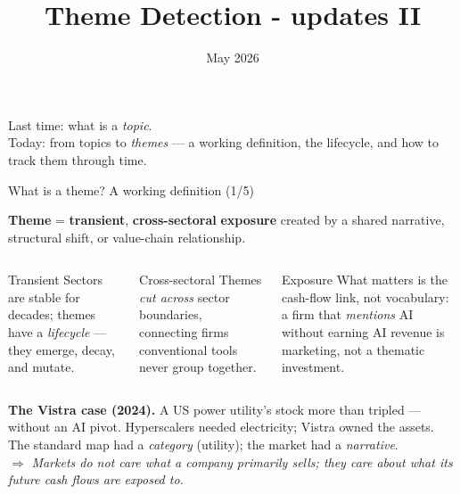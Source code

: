 \documentclass[10pt,aspectratio=169]{beamer}
\title{Theme Detection - updates II}
\date{May 2026}
\begin{document}
\begin{frame}[shrink=5]
  \titlepage
  \vspace{-1.0cm}
  \centering\footnotesize
  Last time: what is a \emph{topic}.\\
  Today: from topics to \emph{themes} --- a working definition, the lifecycle, and how to track them through time.
\end{frame}


\begin{frame}[t]{What is a theme? A working definition (1/5)}
  \footnotesize

  \begin{tcolorbox}[colback=accent!8, colframe=accent, boxrule=0.4pt,
                    left=4pt, right=4pt, top=3pt, bottom=3pt]
    \textbf{Theme} \;=\; \textbf{transient}, \textbf{cross-sectoral} \textbf{exposure}
    created by a shared narrative, structural shift, or value-chain relationship.
  \end{tcolorbox}

  \vspace{0.15cm}
  \begin{columns}[T,onlytextwidth]
      \begin{block}{Transient}
        \footnotesize
        Sectors are stable for decades; themes have a \emph{lifecycle} ---
        they emerge, decay, and mutate.
      \end{block}

      \begin{block}{Cross-sectoral}
        \footnotesize
        Themes \emph{cut across} sector boundaries, connecting firms
        conventional tools never group together.
      \end{block}

      \begin{block}{Exposure}
        \footnotesize
        What matters is the cash-flow link, not vocabulary: a firm that
        \emph{mentions} AI without earning AI revenue is marketing,
        not a thematic investment.
      \end{block}
  \end{columns}

  \vspace{0.30cm}
  \textbf{The Vistra case (2024).}\;
  A US power utility's stock more than tripled --- without an AI pivot.
  Hyperscalers needed electricity; Vistra owned the assets.
  The standard map had a \emph{category} (utility); the market had a \emph{narrative}.\\[0.05cm]
  \(\Rightarrow\) \emph{Markets do not care what a company primarily sells; they care
  about what its future cash flows are exposed to.}

\end{frame}
\end{document}
